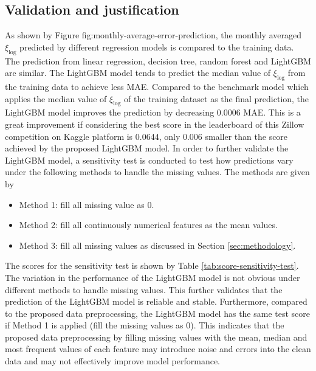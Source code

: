 \documentclass[12pt]{article}
\begin{document}
\subsection{Validation and justification}
As shown by Figure {fig:monthly-average-error-prediction}, the monthly averaged $\xi_{\log}$ predicted by different regression models is compared to the training data. The prediction from linear regression, decision tree, random forest and LightGBM are similar. The LightGBM model tends to predict the median value of $\xi_{\log}$ from the training data to achieve less MAE. Compared to the benchmark model which applies the median value of $\xi_{\log}$ of the training dataset as the final prediction, the LightGBM model improves the prediction by decreasing 0.0006 MAE. This is a great improvement if considering the best score in the leaderboard of this Zillow competition on Kaggle platform is 0.0644, only 0.006 smaller than the score achieved by the proposed LightGBM model. In order to further validate the LightGBM model, a sensitivity test is conducted to test how predictions vary under the following methods to handle the missing values. The methods are given by

\begin{itemize}
	\item Method 1: fill all missing value as 0.
\end{itemize}

\begin{itemize}
	\item Method 2: fill all continuously numerical features as the mean values.
\end{itemize}

\begin{itemize}
	\item Method 3: fill all missing values as discussed in Section \ref{sec:methodology}.
\end{itemize}

The scores for the sensitivity test is shown by Table \ref{tab:score-sensitivity-test}. The variation in the performance of the LightGBM model is not obvious under different methods to handle missing values. This further validates that the prediction of the LightGBM model is reliable and stable. Furthermore, compared to the proposed data preprocessing, the LightGBM model has the same test score if Method 1 is applied (fill the missing values as 0). This indicates that the proposed data preprocessing by filling missing values with the mean, median and most frequent values of each feature may introduce noise and errors into the clean data and may not effectively improve model performance. 
\end{document}
